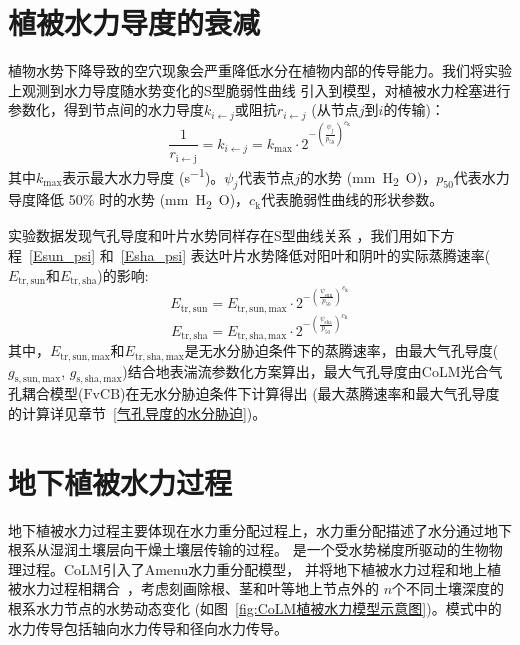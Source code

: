 \section{植被水力导度的衰减}\label{植被水力导度的衰减}
植物水势下降导致的空穴现象会严重降低水分在植物内部的传导能力。我们将实验上观测到水力导度随水势变化的S型脆弱性曲线
\citep{sperry1988method,gentine2016allometry,neufeld1992genotypic,pammenter1998mathematical,plaut2012hydraulic}
引入到模型，对植被水力栓塞进行参数化，得到节点间的水力导度$k_{i\gets j}$或阻抗$r_{i\gets j}$ (从节点$j$到$i$的传输)：
\begin{equation}\label{kij}
  \frac{1}{r_{\mathrm{i\gets j}}} = k_{i\gets j}=k_{\mathrm{max}} \cdot 2^{-\left(\frac{\psi_{j}}{p_{50}}\right)^{c_{\mathrm{k}}}}
\end{equation}
其中$k_{\mathrm{max}}$表示最大水力导度 (\unit{s^{-1}})。$\psi_j$代表节点$j$的水势 (\unit{mm.H_2O})，$p_{50}$代表水力导度降低 50\% 时的水势 (\unit{mm.H_2O})，$c_{\mathrm {k}}$代表脆弱性曲线的形状参数。


实验数据发现气孔导度和叶片水势同样存在S型曲线关系 \citep{kennedy2019implementing,klein2014variability}，我们用如下方程~\eqref{Esun_psi} 和~\eqref{Esha_psi} 表达叶片水势降低对阳叶和阴叶的实际蒸腾速率($E_{\mathrm{tr,sun}}$和$E_{\mathrm{tr,sha}}$)的影响:
\begin{equation}\label{Esun_psi}
  E_{\mathrm{tr,sun}}=E_{\mathrm{tr,sun,max}} \cdot 2^{-\left(\frac{\psi_{\mathrm{\mathrm{sun}}}}{p_{50}}\right)^{c_{\mathrm{k}}}}
\end{equation}
\begin{equation}\label{Esha_psi}
  E_{\mathrm{tr,sha}}=E_{\mathrm{tr,sha,max}} \cdot 2^{-\left(\frac{\psi_{\mathrm{sha}}}{p_{50}}\right)^{c_{\mathrm{k}}}}
\end{equation}
其中，$E_{\mathrm{tr,sun,max}}$和$E_{\mathrm{tr,sha,max}}$是无水分胁迫条件下的蒸腾速率，由最大气孔导度($g_{\mathrm{s,sun,max}}$, $g_{\mathrm{s,sha,max}}$)结合地表湍流参数化方案算出，最大气孔导度由CoLM光合气孔耦合模型(${\mathrm {FvCB}}$)在无水分胁迫条件下计算得出 (最大蒸腾速率和最大气孔导度的计算详见章节~\ref{气孔导度的水分胁迫})。


\section{地下植被水力过程}\label{地下植被水力过程}
地下植被水力过程主要体现在水力重分配过程上，水力重分配描述了水分通过地下根系从湿润土壤层向干燥土壤层传输的过程。
是一个受水势梯度所驱动的生物物理过程。CoLM引入了Amenu水力重分配模型\citep{amenu2008,zhu2017incorporating}，
并将地下植被水力过程和地上植被水力过程相耦合~\citep{li2021new}，考虑刻画除根、茎和叶等地上节点外的
$n$个不同土壤深度的根系水力节点的水势动态变化 (如图~\ref{fig:CoLM植被水力模型示意图})。模式中的水力传导包括轴向水力传导和径向水力传导。

